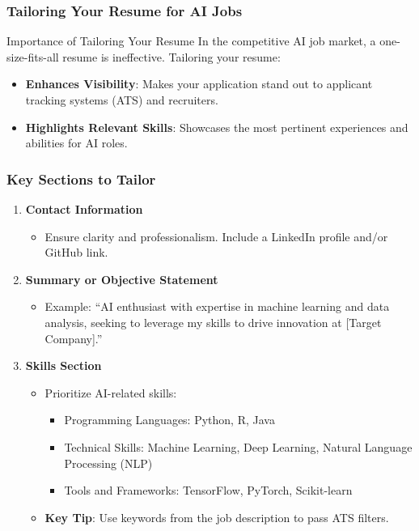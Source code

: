 \documentclass{beamer}
\begin{document}
\begin{frame}[fragile]
    \frametitle{Tailoring Your Resume for AI Jobs}
    \begin{block}{Importance of Tailoring Your Resume}
        In the competitive AI job market, a one-size-fits-all resume is ineffective. Tailoring your resume:
        \begin{itemize}
            \item \textbf{Enhances Visibility}: Makes your application stand out to applicant tracking systems (ATS) and recruiters.
            \item \textbf{Highlights Relevant Skills}: Showcases the most pertinent experiences and abilities for AI roles.
        \end{itemize}
    \end{block}
\end{frame}

\begin{frame}[fragile]
    \frametitle{Key Sections to Tailor}
    \begin{enumerate}
        \item \textbf{Contact Information}
        \begin{itemize}
            \item Ensure clarity and professionalism. Include a LinkedIn profile and/or GitHub link.
        \end{itemize}

        \item \textbf{Summary or Objective Statement}
        \begin{itemize}
            \item Example: ``AI enthusiast with expertise in machine learning and data analysis, seeking to leverage my skills to drive innovation at [Target Company].''
        \end{itemize}

        \item \textbf{Skills Section}
        \begin{itemize}
            \item Prioritize AI-related skills:
              \begin{itemize}
                \item Programming Languages: Python, R, Java
                \item Technical Skills: Machine Learning, Deep Learning, Natural Language Processing (NLP)
                \item Tools and Frameworks: TensorFlow, PyTorch, Scikit-learn
              \end{itemize}
            \item \textbf{Key Tip}: Use keywords from the job description to pass ATS filters.
        \end{itemize}
    \end{enumerate}
\end{frame}
\end{document}
